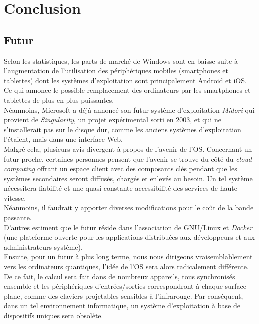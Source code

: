 \section{Conclusion}
\subsection{Futur}
Selon les statistiques, les parts de marché de Windows sont en baisse suite à
l’augmentation de l’utilisation des périphériques mobiles (smartphones et
tablettes) dont les systèmes d'exploitation sont principalement Android et iOS.
Ce qui annonce le possible remplacement des ordinateurs par les smartphones et
tablettes de plus en plus puissantes. \\

Néanmoins, Microsoft a déjà annoncé son futur système d'exploitation
\textit{Midori} qui provient de \textit{Singularity}, un projet expérimental
sorti en 2003, et qui ne s'installerait pas sur le disque dur, comme les
anciens systèmes d'exploitation l'étaient, mais dans une interface Web. \\

Malgré cela, plusieurs avis divergent à propos de l'avenir de l'OS. Concernant
un futur proche, certaines personnes pensent que l'avenir se trouve du côté
du \textit{cloud computing} offrant un espace client avec des composants clés
pendant que les systèmes secondaires seront diffusés, chargés et enlevés au
besoin. Un tel système nécessitera fiabilité et une quasi constante accessibilité
des services de haute vitesse. \\
Néanmoins, il faudrait y apporter diverses modifications pour le coût de la
bande passante. \\

D'autres estiment que le futur réside dans l'association de GNU/Linux et
\textit{Docker} (une plateforme ouverte pour les applications distribuées aux
développeurs et aux administrateurs système). \\

Ensuite, pour un futur à plus long terme, nous nous dirigeons vraisemblablement
vers les ordinateurs quantiques, l'idée de l'OS sera alors radicalement différente.
De ce fait, le calcul sera fait dans de nombreux appareils, tous synchronisés
ensemble et les périphériques d'entrées/sorties correspondront à chaque
surface plane, comme des claviers projetables sensibles à l'infrarouge. Par
conséquent, dans un tel environnement informatique, un système d'exploitation à
base de dispositifs uniques sera obsolète. \\

